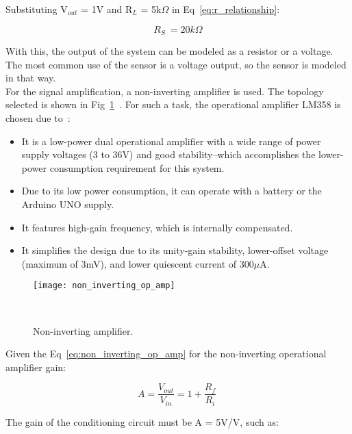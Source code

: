 Substituting V$_{out}$ = 1V and R$_{L}$ = 5k$\Omega$ in Eq~\ref{eq:r_relationship}:

\begin{equation}
    R_{S} ~= 20k\Omega
    \label{eq:rs_at_1v}
\end{equation}

With this, the output of the system can be modeled as a resistor or a voltage. The most common use of the sensor is a voltage output, so the sensor is modeled in that way. \\

For the signal amplification, a non-inverting amplifier is used. The topology selected is shown in Fig~\ref{fig:non_inverting_op_amp}~\cite{svoboda_2013}. For such a task, the operational amplifier LM358 is chosen due to~\cite{lm358_datasheet}:

\begin{itemize}
    \item It is a low-power dual operational amplifier with a wide range of power supply voltages (3 to 36V) and good stability--which accomplishes the lower-power consumption requirement for this system.

    \item Due to its low power consumption, it can operate with a battery or the Arduino UNO supply.

    \item It features high-gain frequency, which is internally compensated.

    \item It simplifies the design due to its unity-gain stability, lower-offset voltage (maximum of 3mV), and lower quiescent current of 300$\mu$A.
\end{itemize}

\begin{figure}[H]
    \centering
    \texttt{[image: non\_inverting\_op\_amp]}
    \caption{Non-inverting amplifier.}
~\label{fig:non_inverting_op_amp}
\end{figure}

Given the Eq~\ref{eq:non_inverting_op_amp} for the non-inverting operational amplifier gain:

\begin{equation}
    A = \frac{V_{out}}{V_{in}} = 1 + \frac{R_{f}}{R_{i}}
~\label{eq:non_inverting_op_amp}
\end{equation}

The gain of the conditioning circuit must be A = 5V/V, such as:

